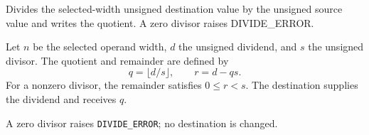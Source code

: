 Divides the selected-width unsigned destination value by the unsigned source value and writes the quotient. A zero divisor raises DIVIDE\_ERROR.

Let \(n\) be the selected operand width, \(d\) the unsigned dividend, and \(s\) the unsigned divisor. The quotient and remainder are defined by
\[
  q = \lfloor d/s \rfloor,
  \qquad r = d - qs .
\]
For a nonzero divisor, the remainder satisfies \(0 \le r < s\). The destination supplies the dividend and receives \(q\).

A zero divisor raises \texttt{DIVIDE\_ERROR}; no destination is changed.
